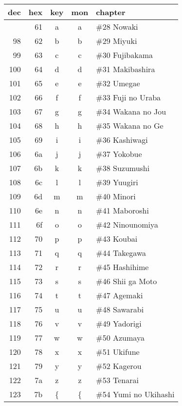 \documentclass[12pt]{article}
\newcommand\genji[1]{{\genjiface #1}}
\begin{document}
\begin{tabular}{rrccl}
 dec & hex & key & mon & chapter \\ \hline \bigstrut[t]
  97 & 61 & a & \genji{\large a} & \#28 Nowaki \\
  98 & 62 & b & \genji{\large b} & \#29 Miyuki \\
  99 & 63 & c & \genji{\large c} & \#30 Fujibakama \\
  100 & 64 & d & \genji{\large d} & \#31 Makibashira \\
  101 & 65 & e & \genji{\large e} & \#32 Umegae \\
  102 & 66 & f & \genji{\large f} & \#33 Fuji no Uraba \\
  103 & 67 & g & \genji{\large g} & \#34 Wakana no Jou \\
  104 & 68 & h & \genji{\large h} & \#35 Wakana no Ge \\
  105 & 69 & i & \genji{\large i} & \#36 Kashiwagi \\
  106 & 6a & j & \genji{\large j} & \#37 Yokobue \\
  107 & 6b & k & \genji{\large k} & \#38 Suzumushi \\
  108 & 6c & l & \genji{\large l} & \#39 Yuugiri \\
  109 & 6d & m & \genji{\large m} & \#40 Minori \\
  110 & 6e & n & \genji{\large n} & \#41 Maboroshi \\
  111 & 6f & o & \genji{\large o} & \#42 Ninounomiya \\
  112 & 70 & p & \genji{\large p} & \#43 Koubai \\
  113 & 71 & q & \genji{\large q} & \#44 Takegawa \\
  114 & 72 & r & \genji{\large r} & \#45 Hashihime \\
  115 & 73 & s & \genji{\large s} & \#46 Shii ga Moto \\
  116 & 74 & t & \genji{\large t} & \#47 Agemaki \\
  117 & 75 & u & \genji{\large u} & \#48 Sawarabi \\
  118 & 76 & v & \genji{\large v} & \#49 Yadorigi \\
  119 & 77 & w & \genji{\large w} & \#50 Azumaya \\
  120 & 78 & x & \genji{\large x} & \#51 Ukifune \\
  121 & 79 & y & \genji{\large y} & \#52 Kagerou \\
  122 & 7a & z & \genji{\large z} & \#53 Tenarai \\
  123 & 7b & \{ & \genji{\large \{} & \#54 Yumi no Ukihashi
\end{tabular}
\end{document}
